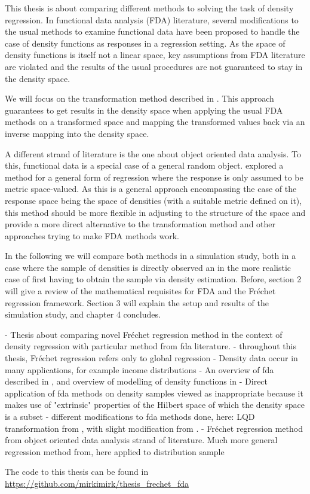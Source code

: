 This thesis is about comparing different methods to solving the task of density
regression. In functional data analysis (FDA) literature, several modifications to
the usual methods to examine functional data have been proposed to handle the case of
density functions as responses in a regression setting. As the space of density functions is itself
not a linear space, key assumptions from FDA literature are violated and the results
of the usual procedures are not guaranteed to stay in the density space.

We will focus on the transformation method described in \textcite{PetersenMüller2016}.
This approach guarantees to get results in the density space when applying the usual
FDA methods on a transformed space and mapping the transformed values back via an
inverse mapping into the density space.

A different strand of literature is the one about object oriented data analysis. To this,
functional data is a special case of a general random object. \textcite{PetersenMüller2019}
explored a method for a general form of regression where the response is only assumed to
be metric space-valued. As this is a general approach encompassing the case of the
response space being the space of densities (with a suitable metric defined on it),
this method should be more flexible in adjusting to the structure of the space and
provide a more direct alternative to the transformation method and other approaches
trying to make FDA methods work.

In the following we will compare both methods in a simulation study, both in a case
where the sample of densities is directly observed an in the more realistic case of
first having to obtain the sample via density estimation. Before, section 2 will give
a review of the mathematical requisites for FDA and the Fréchet regression framework.
Section 3 will explain the setup and results of the simulation study, and chapter 4
concludes.

- Thesis about comparing novel Fréchet regression method in the context of density regression
with particular method from fda literature.
- throughout this thesis, Fréchet regression refers only to global regression
- Density data occur in many applications, for example income distributions \parencite{HildenbrandKneipUtikal1999}
- An overview of fda described in \textcite{WangChiouMüller2016}, and overview of modelling
of density functions in \textcite{PetersenZhangKokoszka2022}
- Direct application of fda methods on density samples viewed as inappropriate because
it makes use of "extrinsic" properties of the Hilbert space of which the density space is
a subset
- different modifications to fda methods done, here: LQD transformation from \textcite{PetersenMüller2016},
with slight modification from \textcite{KokoszkaEtAl2019}.
- Fréchet regression method \textcite{PetersenMüller2019} from object oriented data analysis strand of literature.
Much more general regression method from, here applied to distribution sample


\citet{HorvathKokoszka2012}
\citet{HallHorowitz2007}
\citet{PetersenMüller2019}
\citet{VanDerVaartWellner1996}
\citet{Bosq2000}
\citet{HastiTibshiraniFriedman2009}
\citet{Boor2001}

The code to this thesis can be found in \url{https://github.com/mirkimirk/thesis_frechet_fda}